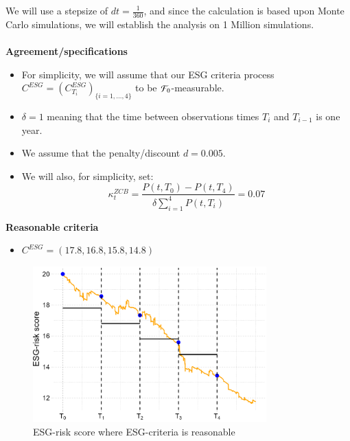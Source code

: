We will use a stepsize of $dt = \frac{1}{360}$, and since the calculation is based upon Monte Carlo simulations, we will establish the analysis on 1 Million simulations. 
\\~\\ 
\textbf{Agreement/specifications}
\begin{itemize}
    \item For simplicity, we will assume that our ESG criteria process $C^{ESG} = (C^{ESG}_{T_{i}})_{
    \{i=1, \dots, 4\}}$ to be $\mathcal{F}_{0}$-measurable. 
    \item $\delta = 1$ meaning that the time between observations times $T_{i}$ and $T_{i-1}$ is one year. 
    \item We assume that the penalty/discount $d = 0.005$.
    \item We will also, for simplicity, set: 
    \[
    \kappa_{t}^{ZCB} = \frac{P(t,T_{0})-P(t,T_{4})}{\delta \sum_{i=1}^{4}P(t,T_{i})} = 0.07
    \]
\end{itemize}
\newpage 

\textbf{Reasonable criteria}
\begin{itemize}
    \item $C^{ESG} = (17.8, 16.8, 15.8, 14.8)$
\end{itemize}

\begin{figure}[htp]
    \centering
    \includegraphics[width= 9cm]{figures/ESG/ESG_plt_criteria1.png}
    \caption{ESG-risk score where ESG-criteria is reasonable}
    \label{fig: ESG_risk_criteria1}
\end{figure}

